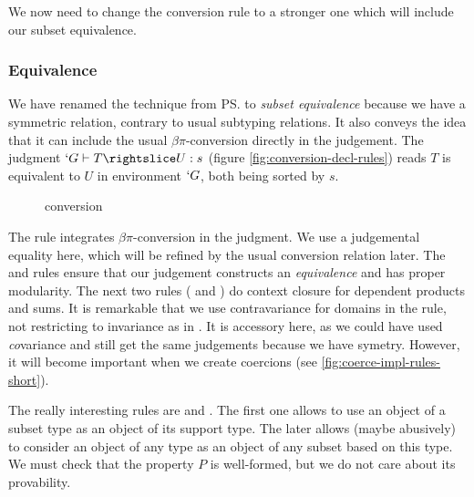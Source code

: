 \documentclass{llncs}
\begin{document}
We now need to change the conversion rule to a stronger one which will
include our subset equivalence.

\subsubsection{Equivalence}
We have renamed the technique from \ps{} to 
\emph{subset equivalence} because we have a symmetric relation, contrary
to usual subtyping relations. It also conveys the idea that it can
include the usual $\beta\pi$-conversion directly in the judgement.
The judgment $`G \typed T \subd{} U : s$ (figure
\vref{fig:conversion-decl-rules}) reads $T$ is equivalent to $U$ in
environment $`G$, both being sorted by $s$. 

\begin{figure}[h]
  \subtdRules
  \caption{\Russell{} conversion}
  \label{fig:conversion-decl-rules}
\end{figure}

The rule  integrates $\beta\pi$-conversion in the
judgment. We use a judgemental equality here, which will be refined by
the usual conversion relation later. The  and
 rules ensure that our judgement constructs an \emph{equivalence} and has
proper modularity. The next two rules ( and
) do context closure for dependent
products and sums. It is remarkable that we use contravariance
\cite{journals/toplas/Castagna95} for
domains in the  rule, not restricting to invariance as in
\PVS. It is accessory here, as we could have used \emph{co}variance and
still get the same judgements because we have symetry. However, it will
become important when we create coercions (see
\vref{fig:coerce-impl-rules-short}).

The really interesting rules are  and
. The first one allows to use an object of a subset type
as an object of its support type. The later allows (maybe abusively) to
consider an object of any type as an object of any subset based on
this type. We must check that the property $P$ is well-formed, but
we do not care about its provability.
\end{document}
